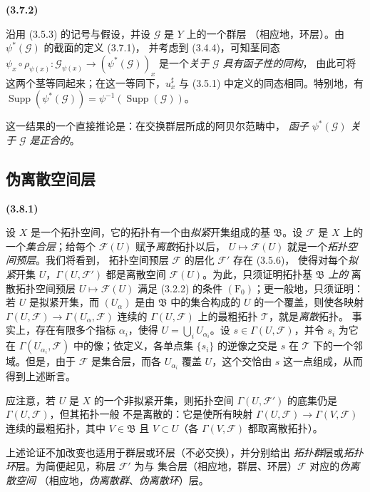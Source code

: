 \documentclass[UTF8,fontset=none,11pt,oneside,openany]{ctexbook}
\newenvironment{env}[1][]{%
  \par\medskip\noindent\textbf{(#1)}\ %
}{\par}
\newcommand{\oldpage}[2][]{%
  \hypertarget{ega-source-page-#1-#2}{}%
  \marginnote{\scriptsize\textbf{#1}~|~#2}\ignorespaces}
\let\EGAOriginalLabel\label
\renewcommand{\label}[1]{\phantomsection\EGAOriginalLabel{#1}}
\begin{document}
\begin{env}[3.7.2]
\label{0.3.7.2-fr}
沿用 (3.5.3) 的记号与假设，并设 $\mathcal{G}$ 是 $Y$ 上的一个群层
（相应地，环层）。由 $\psi^*(\mathcal{G})$ 的截面的定义 (3.7.1)，
并考虑到 (3.4.4)，可知茎同态
$\psi_x\circ\rho_{\psi(x)}:\mathcal{G}_{\psi(x)}\to
(\psi^*(\mathcal{G}))_x$ 是一个\emph{关于 $\mathcal{G}$ 具有函子性的同构}，
由此可将这两个茎等同起来；在这一等同下，$u_x^\sharp$ 与 (3.5.1)
中定义的同态相同。特别地，有
$\operatorname{Supp}(\psi^*(\mathcal{G}))=
\psi^{-1}(\operatorname{Supp}(\mathcal{G}))$。

这一结果的一个直接推论是：在交换群层所成的阿贝尔范畴中，
\emph{函子 $\psi^*(\mathcal{G})$ 关于 $\mathcal{G}$ 是正合的}。
\end{env}

\subsection{伪离散空间层}

\oldpage[0\textsubscript{I}]{35}

\begin{env}[3.8.1]
\label{0.3.8.1-fr}
设 $X$ 是一个拓扑空间，它的拓扑有一个由\emph{拟紧}开集组成的基
$\mathfrak{B}$。设 $\mathcal{F}$ 是 $X$ 上的一个\emph{集合层}；给每个
$\mathcal{F}(U)$ 赋予\emph{离散}拓扑以后，
$U\mapsto\mathcal{F}(U)$ 就是一个\emph{拓扑空间预层}。我们将看到，
拓扑空间预层 $\mathcal{F}$ 的层化 $\mathcal{F}'$ 存在 (3.5.6)，
使得对每个\emph{拟紧}开集 $U$，$\Gamma(U,\mathcal{F}')$ 都是离散空间
$\mathcal{F}(U)$。为此，只须证明拓扑基 $\mathfrak{B}$ \emph{上的}
离散拓扑空间预层 $U\mapsto\mathcal{F}(U)$ 满足 (3.2.2) 的条件
$(\mathrm{F}_0)$；更一般地，只须证明：若 $U$ 是拟紧开集，而
$(U_\alpha)$ 是由 $\mathfrak{B}$ 中的集合构成的 $U$ 的一个覆盖，则使各映射
$\Gamma(U,\mathcal{F})\to\Gamma(U_\alpha,\mathcal{F})$ 连续的
$\Gamma(U,\mathcal{F})$ 上的最粗拓扑 $\mathcal{T}$，就是\emph{离散}拓扑。
事实上，存在有限多个指标 $\alpha_i$，使得
$U=\bigcup_i U_{\alpha_i}$。设 $s\in\Gamma(U,\mathcal{F})$，并令 $s_i$
为它在 $\Gamma(U_{\alpha_i},\mathcal{F})$ 中的像；依定义，各单点集
$\{s_i\}$ 的逆像之交是 $s$ 在 $\mathcal{T}$ 下的一个邻域。但是，由于
$\mathcal{F}$ 是集合层，而各 $U_{\alpha_i}$ 覆盖 $U$，这个交恰由
$s$ 这一点组成，从而得到上述断言。

应注意，若 $U$ 是 $X$ 的一个非拟紧开集，则拓扑空间
$\Gamma(U,\mathcal{F}')$ 的底集仍是 $\Gamma(U,\mathcal{F})$，但其拓扑一般
不是离散的：它是使所有映射
$\Gamma(U,\mathcal{F})\to\Gamma(V,\mathcal{F})$ 连续的最粗拓扑，其中
$V\in\mathfrak{B}$ 且 $V\subset U$（各 $\Gamma(V,\mathcal{F})$ 都取离散拓扑）。

上述论证不加改变也适用于群层或环层（不必交换），并分别给出
\emph{拓扑群}层或\emph{拓扑环}层。为简便起见，称层 $\mathcal{F}'$ 为与
集合层（相应地，群层、环层）$\mathcal{F}$ 对应的\emph{伪离散空间}
（相应地，\emph{伪离散群}、\emph{伪离散环}）层。
\end{env}
\end{document}
